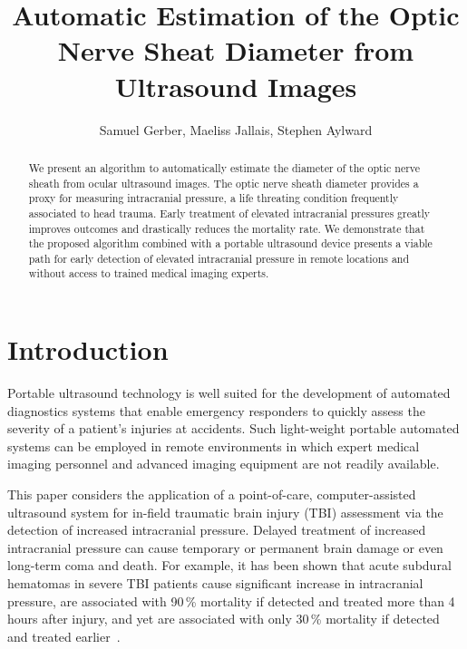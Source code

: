 \documentclass{llncs}
\begin{document}
\title{Automatic Estimation of the Optic Nerve Sheat Diameter from Ultrasound Images}
%
%
\author{
Samuel Gerber,
Maeliss Jallais,
Stephen Aylward
}

%
%
%

\maketitle              %

\begin{abstract}
We present an algorithm to automatically estimate the diameter of the optic
nerve sheath from ocular ultrasound images. The optic nerve sheath diameter
provides a proxy for measuring intracranial pressure,  a life threating
condition frequently associated to head trauma. Early treatment of elevated
intracranial pressures greatly improves outcomes and drastically reduces the 
mortality rate. We demonstrate that the proposed algorithm combined with a
portable ultrasound device presents a viable path for early detection of
elevated intracranial pressure in remote locations and without access to trained
medical imaging experts. 
\end{abstract}
%
\section{Introduction}
Portable ultrasound technology is well suited for the development of automated
diagnostics systems that enable emergency responders to quickly assess the
severity of a patient's injuries at accidents. Such light-weight portable
automated systems can be employed in remote environments in which expert medical
imaging personnel and advanced imaging equipment are not readily available.
 
This paper considers the application of a point-of-care, computer-assisted
ultrasound system for in-field traumatic brain injury (TBI) assessment via the
detection of increased intracranial pressure. Delayed treatment of increased
intracranial pressure can cause temporary or permanent brain damage or even
long-term coma and death. For example, it has been shown that acute subdural
hematomas in severe TBI patients cause significant increase in intracranial
pressure, are associated with 90\,\% mortality if detected and treated more than
4 hours after injury, and yet are associated with only 30\,\% mortality if
detected and treated earlier~\cite{Se1981}.
\end{document}
